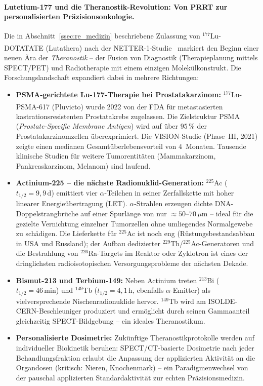﻿\documentclass[12pt, a4paper]{report}
\theoremstyle{definition}
\theoremstyle{remark}
\begin{document}
\paragraph{Lutetium-177 und die Theranostik-Revolution: Von PRRT zur
personalisierten Präzisionsonkologie.}
Die in Abschnitt~\ref{ssec:re_medizin} beschriebene Zulassung von
$^{177}$Lu-DOTATATE (Lutathera\textsuperscript{\textregistered}) nach der
NETTER-1-Studie~\cite{strosberg2017} markiert den Beginn einer neuen Ära
der \emph{Theranostik} -- der Fusion von Diagnostik (Therapie\-planung mittels
SPECT/PET) und Radiotherapie mit einem einzigen Molekülkonstrukt. Die
Forschungslandschaft expandiert dabei in mehrere Richtungen:

\begin{itemize}
  \item \textbf{PSMA-gerichtete Lu-177-Therapie bei Prostatakarzinom:}
    $^{177}$Lu-PSMA-617 (Pluvicto\textsuperscript{\textregistered}) wurde
    2022 von der FDA für metastasierten kastrationsresistenten Prostatakrebs
    zugelassen. Die Zielstruktur PSMA (\emph{Prostate-Specific Membrane
    Antigen}) wird auf über $95\,\%$ der Prostatakarzinomzellen überexprimiert.
    Die VISION-Studie (Phase~III, 2021) zeigte einen medianen
    Gesamtüberlebensvorteil von $4$~Monaten. Tausende klinische Studien für
    weitere Tumorentitäten (Mammakarzinom, Pankreaskarzinom, Melanom) sind
    laufend.

  \item \textbf{Actinium-225 -- die nächste Radionuklid-Generation:}
    $^{225}$Ac ($t_{1/2} = 9{,}9\,\text{d}$) emittiert vier
    $\alpha$-Teilchen in seiner Zerfallskette mit hoher linearer
    Energieübertragung (LET). $\alpha$-Strahlen erzeugen dichte
    DNA-Doppelstrangbrüche auf einer Spurlänge von nur $\approx
    50$--$70\,\mu\text{m}$ -- ideal für die gezielte Vernichtung einzelner
    Tumorzellen ohne umliegendes Normalgewebe zu schädigen. Die
    Lieferkette für $^{225}$Ac ist noch eng (Rüstungsbestandsabbau in USA
    und Russland); der Aufbau dedizierter $^{229}$Th/$^{225}$Ac-Generatoren
    und die Bestrahlung von $^{226}$Ra-Targets im Reaktor oder Zyklotron ist
    eines der dringlichsten radioisotopischen Versorgungsprobleme der nächsten
    Dekade.

  \item \textbf{Bismut-213 und Terbium-149:}
    Neben Actinium treten $^{213}$Bi ($t_{1/2} = 46\,\text{min}$) und
    $^{149}$Tb ($t_{1/2} = 4{,}1\,\text{h}$, ebenfalls $\alpha$-Emitter)
    als vielversprechende Nischenradionuklide hervor. $^{149}$Tb wird am
    ISOLDE-CERN-Beschleuniger produziert und ermöglicht durch seinen
    Gammaanteil gleichzeitig SPECT-Bildgebung -- ein ideales Theranostikum.

  \item \textbf{Personalisierte Dosimetrie:}
    Zukünftige Theranostikprotokolle werden auf individueller Biokinetik
    beruhen: SPECT/CT-basierte Dosimetrie nach jeder Behandlungsfraktion
    erlaubt die Anpassung der applizierten Aktivität an die Organdosen
    (kritisch: Nieren, Knochenmark) -- ein Paradigmenwechsel von der
    pauschal applizierten Standardaktivität zur echten Präzisionsmedizin.
\end{itemize}
\end{document}
